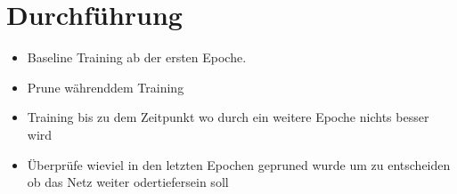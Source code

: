 \chapter{Durchführung}

\begin{itemize}
 \item Baseline Training ab der ersten Epoche.
 \item Prune währenddem Training
 \item Training bis zu dem Zeitpunkt wo durch ein weitere Epoche nichts besser wird
 \item Überprüfe wieviel in den letzten Epochen gepruned wurde um zu entscheiden ob das Netz weiter odertiefersein soll
\end{itemize}
